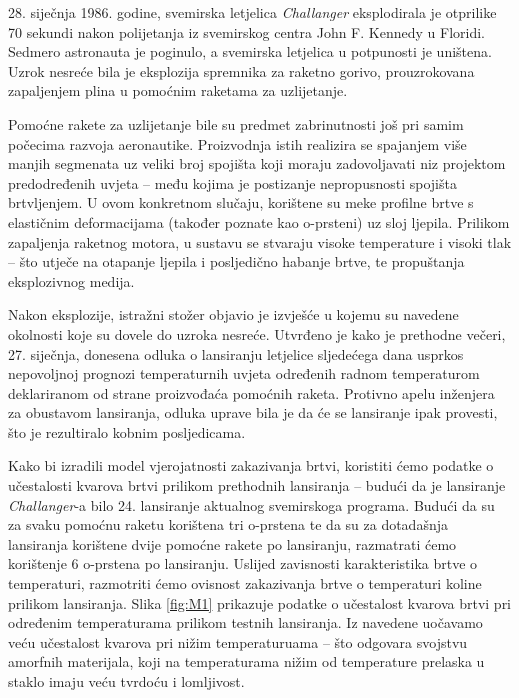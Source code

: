 \documentclass[a4paper,12pt,oneside]{memoir}
\begin{document}
        28. siječnja 1986. godine, svemirska letjelica \textit{Challanger} eksplodirala je otprilike 70 sekundi nakon polijetanja iz svemirskog centra John F. Kennedy u Floridi. Sedmero astronauta je poginulo, a svemirska letjelica u potpunosti je uništena. Uzrok nesreće bila je eksplozija spremnika za raketno gorivo, prouzrokovana zapaljenjem plina u pomoćnim raketama za uzlijetanje.

        Pomoćne rakete za uzlijetanje bile su predmet zabrinutnosti još pri samim počecima razvoja aeronautike. Proizvodnja istih realizira se spajanjem više manjih segmenata uz veliki broj spojišta koji moraju zadovoljavati niz projektom predodređenih uvjeta -- među kojima je postizanje nepropusnosti spojišta brtvljenjem. U ovom konkretnom slučaju, korištene su meke profilne brtve s elastičnim deformacijama (također poznate kao o-prsteni) uz sloj ljepila. Prilikom zapaljenja raketnog motora, u sustavu se stvaraju visoke temperature i visoki tlak -- što utječe na otapanje ljepila i posljedično habanje brtve, te propuštanja eksplozivnog medija.

        Nakon eksplozije, istražni stožer objavio je izvješće u kojemu su navedene okolnosti koje su dovele do uzroka nesreće. Utvrđeno je kako je prethodne večeri, 27. siječnja, donesena odluka o lansiranju letjelice sljedećega dana usprkos nepovoljnoj prognozi temperaturnih uvjeta određenih radnom temperaturom deklariranom od strane proizvođaća pomoćnih raketa. Protivno apelu inženjera za obustavom lansiranja, odluka uprave bila je da će se lansiranje ipak provesti, što je rezultiralo kobnim posljedicama.


        Kako bi izradili model vjerojatnosti zakazivanja brtvi, koristiti ćemo podatke o učestalosti kvarova brtvi prilikom prethodnih lansiranja -- budući da je lansiranje \textit{Challanger}-a bilo 24. lansiranje aktualnog svemirskoga programa. Budući da su za svaku pomoćnu raketu korištena tri o-prstena te da su za dotadašnja lansiranja korištene dvije pomoćne rakete po lansiranju, razmatrati ćemo korištenje 6 o-prstena po lansiranju. Uslijed zavisnosti karakteristika brtve o temperaturi, razmotriti ćemo ovisnost zakazivanja brtve o temperaturi koline prilikom lansiranja. Slika \ref{fig:M1} prikazuje podatke o učestalost kvarova brtvi pri određenim temperaturama prilikom testnih lansiranja. Iz navedene uočavamo veću učestalost kvarova pri nižim temperaturuama -- što odgovara svojstvu amorfnih materijala, koji na temperaturama nižim od temperature prelaska u staklo imaju veću tvrdoću i lomljivost.
\end{document}

